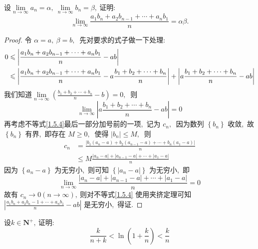 \newpage
\begin{problem}
	设$\lim\limits_{n\rightarrow\infty}a_n=\alpha,\ \lim\limits_{n\rightarrow\infty}b_n=\beta,\ $证明:
	$$\lim\limits_{n\rightarrow\infty}\frac{a_1b_n+a_2b_{n-1}+\cdots+a_nb_1}{n}=\alpha\beta.$$
\end{problem}
\begin{proof}
	令 $ \alpha=a,\  \beta=b ,\ $ 先对要求的式子做一下处理:
	\begin{align}
		0 & \leqslant\left|\frac{a_{1} b_{n}+a_{2} b_{n-1}+\cdots+a_{n} b_{1}}{n}-a b\right|\notag \\
		& \leqslant\left|\frac{a_{1} b_{n}+a_{2} b_{n-1}+\cdots+a_{n} b_{1}}{n}-a \frac{b_{1}+b_{2}+\cdots+b_{n}}{n}\right|+\left|a \frac{b_{1}+b_{2}+\cdots+b_{n}}{n}-a b\right|\label{1.5.4}
	\end{align}
	我们知道$  \lim\limits_{n \rightarrow \infty}\left(\frac{b_{1}+b_{2}+\cdots+b_{n}}{n}-b\right)=0 ,\ $ 则
	$$\lim\limits_{n \rightarrow \infty}\left|a \frac{b_{1}+b_{2}+\cdots+b_{n}}{n}-a b\right|=0$$
	再考虑不等式\eqref{1.5.4}最后一部分加号前的一项,\  记为 $ c_{n} ,\ $ 因为数列 $ \left\{b_{n}\right\}$  收敛,\  故$  \left\{b_{n}\right\}$  有界,\  即存在 $ M \geqslant 0 ,\ $ 使得  $\left|b_{n}\right| \leqslant M ,\ $ 则
	$$\begin{aligned}
		c_{n} & =\frac{\left|b_{1}\left(a_{n}-a\right)+b_{2}\left(a_{n-1}-a\right)+\cdots+b_{n}\left(a_{1}-a\right)\right|}{n} \\
		& \leqslant M \frac{\left|a_{n}-a\right|+\left|a_{n-1}-a\right|+\cdots+\left|a_{1}-a\right|}{n}
	\end{aligned}$$
	因为 $ \left\{a_{n}-a\right\} $ 为无穷小,\  则可知  $\left\{\left|a_{n}-a\right|\right\} $ 为无穷小,\  即
	$$\lim _{n \rightarrow \infty} \frac{\left|a_{n}-a\right|+\left|a_{n-1}-a\right|+\cdots+\left|a_{1}-a\right|}{n}=0$$
	故有  $c_{n} \rightarrow 0(n \rightarrow \infty) ,\  $则对不等式\eqref{1.5.4} 使用夹挤定理可知$  \left|\frac{a_{1} b_{n}+a_{2} b_{n}-1+\cdots+a_{n} b_{1}}{n}-a b\right| $ 是无穷小,\  得证.
\end{proof}
\newpage
\begin{problem}
	设$k\in\mathbf{N}^+,\ $证明:
	$$\frac{k}{n+k}<\ln\left(1+\frac{k}{n}\right)<\frac{k}{n}$$
\end{problem}

